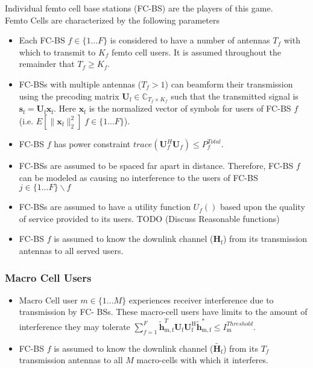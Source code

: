 \documentclass[12pt]{article}
\begin{document}
Individual femto cell base stations (FC-BS) are the players of this game.
\\
Femto Cells are characterized by the following parameters
\begin{itemize}
\item 
	Each FC-BS  $f \in \{1 ... F\}$ is considered to have a number of antennas $T_f$ with which to transmit to $K_f$ femto cell users. It is assumed throughout the remainder that $T_f \geq K_f$.
\\
\item 
	FC-BSs with multiple antennas ($T_f >1$) can beamform their transmission using the precoding 	
	matrix $\mathbf{U}_{\mathrm{f}} \in \mathbb{C}_{T_f \times K_f}$ such that the transmitted 		
	signal is $\mathbf{s}_{\mathrm{f}
	}= \mathbf{U_{\mathrm{f}}}\mathbf{x_{\mathrm{f}}}$. Here $\mathbf{x_{\mathrm{f}}}$ is the 		
	normalized vector of symbols for users of FC-BS $f$ (i.e. $E[\|\mathbf{x}_{\mathrm{f}}
	\|_2^2] \; f \in \{1 ... F\}$).
\\
\item 
	FC-BS $f$ has power constraint $trace(\mathbf{U}_f^H\mathbf{U}_f) \leq P^{Total}_{f} $.
\\
\item
	 FC-BSs are assumed to be spaced far apart in distance. Therefore, FC-BS $f$ can be modeled as 
	 causing no interference to the users of FC-BS $j \in \{1 ... F\}\backslash f$
\item 
	FC-BSs are assumed to have a utility function $U_f()$ based upon the quality of service 		
	provided to its users. TODO (Discuss Reasonable functions)
\\
\item 
	FC-BS $f$ is assumed to know the downlink channel ($\mathbf{H_\mathrm{f}}$) from its transmission 		
	antennas to all served users.
\\
\end{itemize}

\subsubsection{Macro Cell Users}

\begin{itemize}
\item 
	Macro Cell user $m \in \{1 ... M\}$ experiences receiver interference due to transmission by
	FC-	BSs. These macro-cell users have limits to the amount of interference they may tolerate 
	$\sum^F_{f=1} \mathbf{\tilde{h}}_{\mathrm{m,f}}^T  \mathbf{U_{\mathrm{f}}} 						
	\mathbf{U_{\mathrm{f}}^{\mathrm{H}}} \mathbf{\tilde{h}_{\mathrm{m,f}}^*} \leq I^{Threshold}		
	_{\mathrm{m}} $.

\item 
	FC-BS $f$ is assumed to know the downlink channel ($\tilde{\mathbf{H}_{\mathrm{f}}}$) from its $T_f$
	transmission antennas to all $M$ macro-cells with which it interferes.
\\
\end{itemize}
\end{document}
